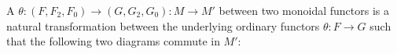 A  $\theta : (F, F_2, F_0) \rightarrow (G, G_2, G_0) : M \to M'$ between two monoidal functors is a natural transformation between the underlying ordinary functors $\theta : F \to G$ such that the following two diagrams commute in $M'$:

\begin{center}
\end{center}

\begin{center}
\end{center}
